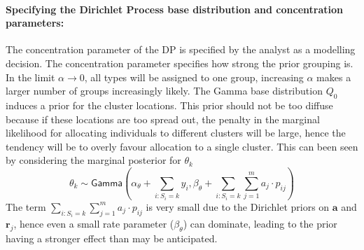 \paragraph{Specifying the Dirichlet Process base distribution and concentration parameters:} The concentration parameter of the DP is specified by the analyst as a modelling decision. The concentration parameter specifies how strong the prior grouping is. In the limit $\alpha\rightarrow 0$, all types will be assigned to one group, increasing $\alpha$ makes a larger number of groups increasingly likely. The Gamma base distribution $Q_{0}$ induces a prior for the cluster locations. This prior should not be too diffuse because if these locations are too spread out, the penalty in the marginal likelihood for allocating individuals to different clusters will be large, hence the tendency will be to overly favour allocation to a single cluster.  This can been seen by considering the marginal posterior for $\theta_k$
\[
\theta_{k} \sim \textsf{Gamma}\left(\alpha_{\theta}+\sum_{i:S_{i}=k}y_{i}, \beta_{\theta}+
\sum_{i:S_{i}=k}\sum_{j=1}^{m}a_{j}\cdot p_{ij}\right)
\]
The term $\sum_{i:S_{i}=k}\sum_{j=1}^{m}a_{j}\cdot p_{ij}$ is very small due to the Dirichlet priors on $\mathbf{a}$ and $\mathbf{r}_j$, hence even a small rate parameter ($\beta_{\theta}$) can 
dominate, leading to the prior having a stronger effect than may be anticipated. 

